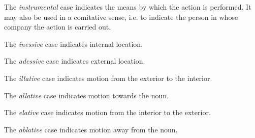 \documentclass[grammar]{subfiles}
\begin{document}
  The \emph{instrumental} case indicates the means by which the action is performed.  It may also be used in a comitative sense, i.e. to indicate the person in whose company the action is carried out.


  The \emph{inessive} case indicates internal location. 


  The \emph{adessive} case indicates external location.


  The \emph{illative} case indicates motion from the exterior to the interior.


  The \emph{allative} case indicates motion towards the noun.


  The \emph{elative} case indicates motion from the interior to the exterior.


  The \emph{ablative} case indicates motion away from the noun.

\end{document}
